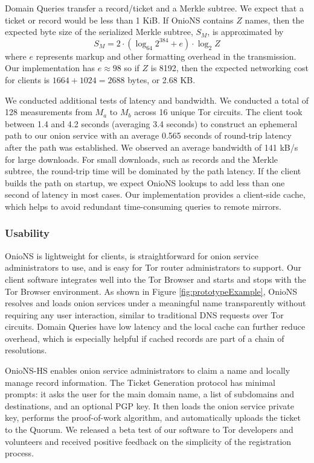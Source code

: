 \documentclass[USenglish,oneside,twocolumn]{article}
\begin{document}
Domain Queries transfer a record/ticket and a Merkle subtree. We expect that a ticket or record would be less than 1 KiB. If OnioNS contains $ Z $ names, then the expected byte size of the serialized Merkle subtree, $ S_{M} $, is approximated by
\[
S_{M} = 2 \cdot (\log_{64} 2^{384} + e) \cdot \log_{2} Z
\]
\noindent where $ e $ represents markup and other formatting overhead in the transmission. Our implementation has $ e \approx 98 $ so if $ Z $ is 8192, then the expected networking cost for clients is $ 1664 + 1024 = 2688 $ bytes, or 2.68 KB. 

We conducted additional tests of latency and bandwidth. We conducted a total of 128 measurements from $ M_{a} $ to $ M_{b} $ across 16 unique Tor circuits. The client took between 1.4 and 4.2 seconds (averaging 3.4 seconds) to construct an ephemeral path to our onion service with an average 0.565 seconds of round-trip latency after the path was established. We observed an average bandwidth of 141 kB/s for large downloads. For small downloads, such as records and the Merkle subtree, the round-trip time will be dominated by the path latency. If the client builds the path on startup, we expect OnioNS lookups to add less than one second of latency in most cases. Our implementation provides a client-side cache, which helps to avoid redundant time-consuming queries to remote mirrors.

\subsubsection{Usability}

OnioNS is lightweight for clients, is straightforward for onion service administrators to use, and is easy for Tor router administrators to support. Our client software integrates well into the Tor Browser and starts and stops with the Tor Browser environment. As shown in Figure \ref{fig:prototypeExample}, OnioNS resolves and loads onion services under a meaningful name transparently without requiring any user interaction, similar to traditional DNS requests over Tor circuits. Domain Queries have low latency and the local cache can further reduce overhead, which is especially helpful if cached records are part of a chain of resolutions. 

OnioNS-HS enables onion service administrators to claim a name and locally manage record information. The Ticket Generation protocol has minimal prompts: it asks the user for the main domain name, a list of subdomains and destinations, and an optional PGP key. It then loads the onion service private key, performs the proof-of-work algorithm, and automatically uploads the ticket to the Quorum. We released a beta test of our software to Tor developers and volunteers and received positive feedback on the simplicity of the registration process.
\end{document}
